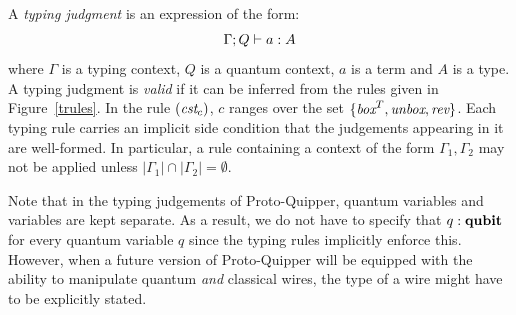 \documentclass[twoside]{article}
\begin{document}
\begin{definition}
A \emph{typing judgment} is an expression of the form:
\[
\Gamma ; Q \vdash a:A
\] 
where $\Gamma$ is a typing context, $Q$ is a quantum context, 
$a$ is a term and $A$ is a type. A typing judgment is \emph{valid} if 
it can be inferred from the rules given in Figure~\hyperref[trules]{\ref*{trules}}. In the rule $(\textit{cst}_c)$, 
$c$ ranges over the set $\{\mathop{\textit{box}}\nolimits^T, \mathop{\textit{unbox}}\nolimits, \mathop{\textit{rev}}\nolimits\}$. Each typing rule
carries an implicit side condition that the judgements appearing in it
are well-formed. In particular, a rule containing a context of the form
$\Gamma_1,\Gamma_2$ may not be applied unless
$|\Gamma_1|\cap|\Gamma_2|=\emptyset$. 
\end{definition}

Note that in the typing judgements of Proto-Quipper, quantum variables
and variables are kept separate. As a result, we do not have to specify
that $q:\textrm{\bf qubit}$ for every quantum variable $q$ since the typing rules
implicitly enforce this. However, when a future version of
Proto-Quipper will be equipped with the ability to manipulate quantum
\emph{and} classical wires, the type of a wire might have to be
explicitly stated.

\end{document}
